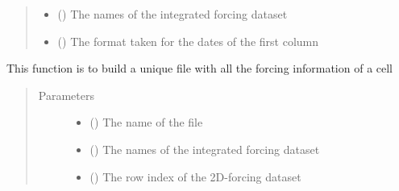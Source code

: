 \documentclass[letterpaper,10pt,english]{sphinxmanual}
\begin{document}
\begin{fulllineitems}
\begin{fulllineitems}
\begin{quote}
\begin{description}
\begin{itemize}
\item {} 
 () \textendash{} The names of the integrated forcing dataset

\item {} 
 () \textendash{} The format taken for the dates of the first column

\end{itemize}

\end{description}\end{quote}

\end{fulllineitems}


\begin{fulllineitems}
\label{\detokenize{AgentTools.GenericModelAgent:AgentTools.GenericModelAgent.ForcingDataFileGenerator.ForcingDataFileGenerator.save_forcing}}
This function is to build a unique file with all the forcing information of a cell
\begin{quote}\begin{description}
\item[{Parameters}] \leavevmode\begin{itemize}
\item {} 
 () \textendash{} The name of the file

\item {} 
 () \textendash{} The names of the integrated forcing dataset

\item {} 
 () \textendash{} The row index of the 2D-forcing dataset


\end{itemize}
\end{description}
\end{quote}
\end{fulllineitems}
\end{fulllineitems}
\end{document}
